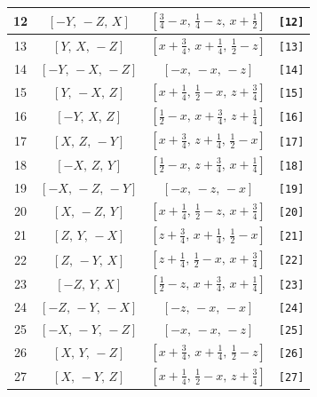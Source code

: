 \documentclass[fleqn,8pt]{jsarticle}
\begin{document}
\begin{longtable}{cccc}
12 & $\left[ - Y,\, - Z,\, X \right]$ & $\left[ \frac{3}{4} - x,\, \frac{1}{4} - z,\, x + \frac{1}{2} \right]$ & {\tt [12]} \\ \hline
13 & $\left[ Y,\, X,\, - Z \right]$ & $\left[ x + \frac{3}{4},\, x + \frac{1}{4},\, \frac{1}{2} - z \right]$ & {\tt [13]} \\ \hline
14 & $\left[ - Y,\, - X,\, - Z \right]$ & $\left[ - x,\, - x,\, - z \right]$ & {\tt [14]} \\ \hline
15 & $\left[ Y,\, - X,\, Z \right]$ & $\left[ x + \frac{1}{4},\, \frac{1}{2} - x,\, z + \frac{3}{4} \right]$ & {\tt [15]} \\ \hline
16 & $\left[ - Y,\, X,\, Z \right]$ & $\left[ \frac{1}{2} - x,\, x + \frac{3}{4},\, z + \frac{1}{4} \right]$ & {\tt [16]} \\ \hline
17 & $\left[ X,\, Z,\, - Y \right]$ & $\left[ x + \frac{3}{4},\, z + \frac{1}{4},\, \frac{1}{2} - x \right]$ & {\tt [17]} \\ \hline
18 & $\left[ - X,\, Z,\, Y \right]$ & $\left[ \frac{1}{2} - x,\, z + \frac{3}{4},\, x + \frac{1}{4} \right]$ & {\tt [18]} \\ \hline
19 & $\left[ - X,\, - Z,\, - Y \right]$ & $\left[ - x,\, - z,\, - x \right]$ & {\tt [19]} \\ \hline
20 & $\left[ X,\, - Z,\, Y \right]$ & $\left[ x + \frac{1}{4},\, \frac{1}{2} - z,\, x + \frac{3}{4} \right]$ & {\tt [20]} \\ \hline
21 & $\left[ Z,\, Y,\, - X \right]$ & $\left[ z + \frac{3}{4},\, x + \frac{1}{4},\, \frac{1}{2} - x \right]$ & {\tt [21]} \\ \hline
22 & $\left[ Z,\, - Y,\, X \right]$ & $\left[ z + \frac{1}{4},\, \frac{1}{2} - x,\, x + \frac{3}{4} \right]$ & {\tt [22]} \\ \hline
23 & $\left[ - Z,\, Y,\, X \right]$ & $\left[ \frac{1}{2} - z,\, x + \frac{3}{4},\, x + \frac{1}{4} \right]$ & {\tt [23]} \\ \hline
24 & $\left[ - Z,\, - Y,\, - X \right]$ & $\left[ - z,\, - x,\, - x \right]$ & {\tt [24]} \\ \hline
25 & $\left[ - X,\, - Y,\, - Z \right]$ & $\left[ - x,\, - x,\, - z \right]$ & {\tt [25]} \\ \hline
26 & $\left[ X,\, Y,\, - Z \right]$ & $\left[ x + \frac{3}{4},\, x + \frac{1}{4},\, \frac{1}{2} - z \right]$ & {\tt [26]} \\ \hline
27 & $\left[ X,\, - Y,\, Z \right]$ & $\left[ x + \frac{1}{4},\, \frac{1}{2} - x,\, z + \frac{3}{4} \right]$ & {\tt [27]} \\ \hline

\end{longtable}
\end{document}
